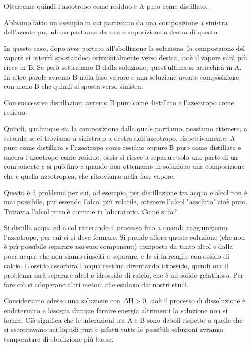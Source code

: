 Otterremo quindi l'azeotropo come residuo e A puro come distillato.

Abbiamo fatto un esempio in cui partivamo da una composizione a sinistra dell'azeotropo, adesso partiamo da una composizione a destra di questo.

In questo caso, dopo aver portato all'ebollizione la soluzione, la composizione del vapore si otterrà spostandoci orizzontalmente verso destra, cioè il vapore sarà più ricco in B. Se però sottraiamo B dalla soluzione, quest'ultima si arricchirà in A. In altre parole avremo B nella fase vapore e una soluzione avente composizione con meno B che quindi si sposta verso sinistra.

Con successive distillazioni avremo B puro come distillato e l'azeotropo come residuo.

Quindi, qualunque sia la composizione dalla quale partiamo, possiamo ottenere, a seconda se ci troviamo a sinistra o a destra dell'azeotropo, rispettivamente, A puro come distillato e l'azeotropo come residuo oppure B puro come distillato e ancora l'azeotropo come residuo, ossia si riesce a separare solo una parte di un componente e si può fino a quando non otteniamo in soluzione una composizione che è quella azeotropica, che ritroviamo nella fase vapore.

Questo è il problema per cui, ad esempio, per distillazione tra acqua e alcol non è mai possibile, pur essendo l'alcol più volatile, ottenere l'alcol "assoluto" cioè puro. Tuttavia l'alcol puro è comune in laboratorio. Come si fa?

Si distilla acqua ed alcol reiterando il processo fino a quando raggiungiamo l'azeotropo, per cui ci si deve fermare. Si prende allora questa soluzione (che non è più possibile separare nei suoi componenti) composta da tanto alcol e dalla poca acqua che non siamo riusciti a separare, e la si fa reagire con ossido di calcio. L'ossido assorbirà l'acqua residua diventando idrossido, quindi ora il problema sarà separare alcol e idrossido di calcio, che è un solido gelatinoso. Per fare ciò si adoperano altri metodi che esulano dai nostri studi.

\vspace{0.2cm}Consideriamo adesso una soluzione con $\Delta$H$>$0, cioè il processo di dissoluzione è endotermico e bisogna dunque fornire energia altrimenti la soluzione non si forma. Ciò significa che le interazioni tra A e B sono deboli rispetto a quelle che si esercitavano nei liquidi puri e infatti tutte le possibili soluzioni avranno temperature di ebollizione più basse.

